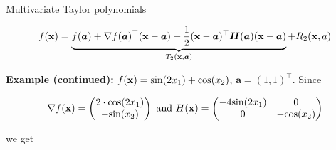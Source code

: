 \documentclass[11pt,compress,t,notes=noshow, xcolor=table]{beamer}
\begin{document}
\begin{vbframe}{Multivariate Taylor polynomials}
\vspace*{-0.7cm}

$$
  f(\mathbf{x}) = \underbrace{f(\bm{a}) + \nabla f(\bm{a})^\top (\mathbf{x} - \bm{a}) + \frac{1}{2}(\mathbf{x} - \bm{a})^\top\bm{H}(\bm{a})(\mathbf{x} - \bm{a})}_{T_2(\mathbf{x}, \bm{a})} + R_2(\mathbf{x}, a) 
$$

\begin{footnotesize}
\textbf{Example (continued):} $f(\mathbf{x}) = \text{sin}(2x_1) + \text{cos}(x_2)$, $\bm{a} = (1, 1)^\top$. Since

$$\nabla f(\mathbf{x}) = \begin{pmatrix} 2\cdot\text{cos}(2x_1) \\ -\text{sin}(x_2) \end{pmatrix}\text{ and } H(\mathbf{x}) = \begin{pmatrix} -4 \text{sin}(2x_1) & 0 \\ 0 & -\text{cos}(x_2) \end{pmatrix} $$
 
we get 

\vspace*{-0.8cm}


\end{footnotesize}
\end{vbframe}
\end{document}
